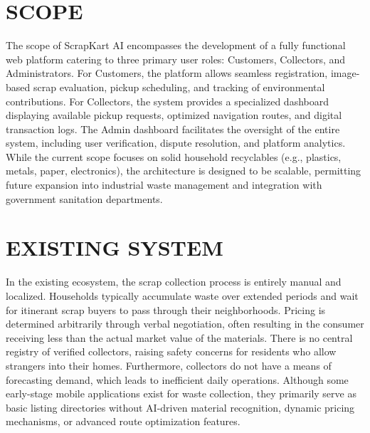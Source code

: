 \section{SCOPE}
The scope of ScrapKart AI encompasses the development of a fully functional web platform catering to three primary user roles: Customers, Collectors, and Administrators. For Customers, the platform allows seamless registration, image-based scrap evaluation, pickup scheduling, and tracking of environmental contributions. For Collectors, the system provides a specialized dashboard displaying available pickup requests, optimized navigation routes, and digital transaction logs. The Admin dashboard facilitates the oversight of the entire system, including user verification, dispute resolution, and platform analytics. While the current scope focuses on solid household recyclables (e.g., plastics, metals, paper, electronics), the architecture is designed to be scalable, permitting future expansion into industrial waste management and integration with government sanitation departments.

\section{EXISTING SYSTEM}
In the existing ecosystem, the scrap collection process is entirely manual and localized. Households typically accumulate waste over extended periods and wait for itinerant scrap buyers to pass through their neighborhoods. Pricing is determined arbitrarily through verbal negotiation, often resulting in the consumer receiving less than the actual market value of the materials. There is no central registry of verified collectors, raising safety concerns for residents who allow strangers into their homes. Furthermore, collectors do not have a means of forecasting demand, which leads to inefficient daily operations. Although some early-stage mobile applications exist for waste collection, they primarily serve as basic listing directories without AI-driven material recognition, dynamic pricing mechanisms, or advanced route optimization features.

